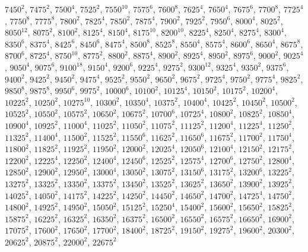 \begin{itemize}
$7450^{2}$, $7475^{2}$, $7500^{4}$, $7525^{2}$, $7550^{10}$, $7575^{6}$, $7600^{8}$, $7625^{4}$, $7650^{4}$, $7675^{6}$, $7700^{8}$, $7725^{4}$, $7750^{8}$, $7775^{8}$, $7800^{2}$, $7825^{4}$, $7850^{2}$, $7875^{4}$, $7900^{2}$, $7925^{2}$, $7950^{6}$, $8000^{4}$, $8025^{2}$, $8050^{12}$, $8075^{2}$, $8100^{2}$, $8125^{4}$, $8150^{4}$, $8175^{10}$, $8200^{10}$, $8225^{4}$, $8250^{4}$, $8275^{4}$, $8300^{4}$, $8350^{6}$, $8375^{4}$, $8425^{6}$, $8450^{6}$, $8475^{4}$, $8500^{8}$, $8525^{8}$, $8550^{4}$, $8575^{4}$, $8600^{6}$, $8650^{4}$, $8675^{8}$, $8700^{6}$, $8725^{4}$, $8750^{10}$, $8775^{2}$, $8800^{2}$, $8875^{4}$, $8900^{2}$, $8925^{4}$, $8950^{2}$, $8975^{6}$, $9000^{2}$, $9025^{4}$, $9050^{4}$, $9075^{6}$, $9100^{18}$, $9150^{4}$, $9200^{6}$, $9225^{4}$, $9275^{2}$, $9300^{12}$, $9325^{4}$, $9350^{2}$, $9375^{6}$, $9400^{2}$, $9425^{2}$, $9450^{2}$, $9475^{4}$, $9525^{2}$, $9550^{2}$, $9650^{2}$, $9675^{2}$, $9725^{4}$, $9750^{2}$, $9775^{4}$, $9825^{2}$, $9850^{8}$, $9875^{8}$, $9950^{6}$, $9975^{2}$, $10000^{6}$, $10100^{2}$, $10125^{4}$, $10150^{2}$, $10175^{2}$, $10200^{4}$, $10225^{2}$, $10250^{2}$, $10275^{10}$, $10300^{2}$, $10350^{4}$, $10375^{2}$, $10400^{4}$, $10425^{2}$, $10450^{2}$, $10500^{2}$, $10525^{2}$, $10550^{2}$, $10575^{2}$, $10650^{2}$, $10675^{2}$, $10700^{6}$, $10725^{4}$, $10800^{2}$, $10825^{2}$, $10850^{4}$, $10900^{4}$, $10925^{2}$, $11000^{4}$, $11025^{2}$, $11050^{2}$, $11075^{2}$, $11125^{2}$, $11200^{4}$, $11225^{4}$, $11250^{2}$, $11325^{2}$, $11400^{4}$, $11500^{2}$, $11525^{2}$, $11550^{6}$, $11625^{2}$, $11650^{6}$, $11675^{2}$, $11700^{2}$, $11750^{4}$, $11800^{2}$, $11825^{2}$, $11925^{2}$, $11950^{2}$, $12000^{2}$, $12025^{4}$, $12050^{6}$, $12100^{4}$, $12150^{2}$, $12175^{2}$, $12200^{2}$, $12225^{4}$, $12250^{2}$, $12400^{4}$, $12450^{6}$, $12525^{2}$, $12575^{4}$, $12700^{6}$, $12750^{2}$, $12800^{4}$, $12850^{2}$, $12900^{2}$, $12950^{2}$, $13000^{4}$, $13050^{2}$, $13075^{2}$, $13150^{6}$, $13175^{2}$, $13200^{6}$, $13225^{2}$, $13275^{2}$, $13325^{2}$, $13350^{2}$, $13375^{2}$, $13450^{2}$, $13525^{2}$, $13625^{2}$, $13650^{2}$, $13900^{2}$, $13925^{2}$, $14025^{2}$, $14050^{2}$, $14175^{2}$, $14225^{2}$, $14250^{2}$, $14450^{2}$, $14650^{2}$, $14700^{2}$, $14725^{4}$, $14750^{2}$, $14800^{2}$, $14925^{2}$, $14950^{2}$, $15050^{2}$, $15125^{2}$, $15250^{4}$, $15400^{2}$, $15600^{2}$, $15650^{2}$, $15825^{2}$, $15875^{2}$, $16225^{2}$, $16325^{2}$, $16350^{2}$, $16375^{2}$, $16500^{2}$, $16550^{2}$, $16575^{2}$, $16650^{2}$, $16900^{2}$, $17075^{2}$, $17600^{2}$, $17650^{2}$, $17700^{2}$, $18400^{2}$, $18725^{2}$, $19150^{2}$, $19275^{2}$, $19600^{2}$, $20300^{2}$, $20625^{2}$, $20875^{2}$, $22000^{2}$, $22675^{2}$
\end{itemize}
